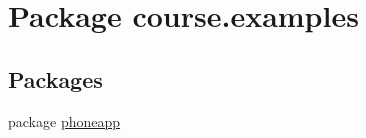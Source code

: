 \hypertarget{namespacecourse_1_1examples}{}\section{Package course.\+examples}
\label{namespacecourse_1_1examples}
\subsection*{Packages}
\begin{DoxyCompactItemize}
\item 
package \hyperlink{namespacecourse_1_1examples_1_1phoneapp}{phoneapp}
\end{DoxyCompactItemize}
